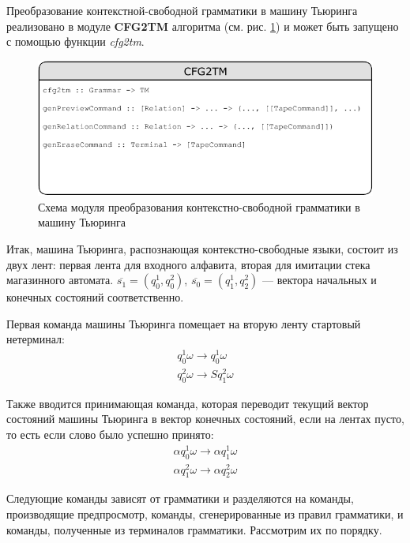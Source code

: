 \documentclass[14pt]{matmex-diploma-custom}
\begin{document}
Преобразование контекстной-свободной грамматики в машину Тьюринга реализовано в модуле \textbf{CFG2TM} алгоритма (см. рис. \ref{fig:cfg2tm}) и может быть запущено с помощью функции \textit{cfg2tm}. 

\begin{figure}[H]
\centering
  \includegraphics[width=\linewidth]{pics/cfg2tm.pdf}
  \caption{Схема модуля преобразования контекстно-свободной грамматики в машину Тьюринга}
  \label{fig:cfg2tm}
\end{figure}

Итак, машина Тьюринга, распознающая контекстно-свободные языки, состоит из двух лент: первая
лента для входного алфавита, вторая для имитации стека магазинного автомата. 
$\overline{s_1} = (q_0^1, q_0^2)$, $\overline{s_0} = (q_1^1, q_2^2)$ --- вектора начальных и конечных
состояний соответственно. 

Первая команда машины Тьюринга помещает на вторую ленту стартовый нетерминал:
$$\begin{array}{lcl}
    q_0^1 \omega \to q_0^1 \omega \\
    q_0^2 \omega \to S q_1^2 \omega 
\end{array}$$

Также вводится принимающая команда, которая переводит текущий вектор состояний машины Тьюринга в вектор конечных состояний, если на лентах пусто, то есть если слово было успешно принято:
$$\begin{array}{lcl}
    \alpha q_0^1 \omega \to \alpha q_1^1 \omega \\
    \alpha q_1^2 \omega \to \alpha q_2^2 \omega 
\end{array}$$

Следующие команды зависят от грамматики и разделяются на команды, производящие предпросмотр, команды, сгенерированные из правил грамматики, 
и команды, полученные из терминалов грамматики. Рассмотрим их по порядку.
\end{document}
